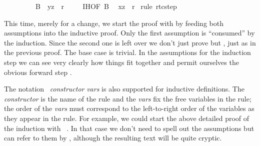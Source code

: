 \begin{isabellebody}
\ \ \ \ \ \ \ \ \ B{}\ \ {}{}y{}z{}\ {}\ r{}{}\isanewline
\ \ \isamarkupfalse%
\ {}\ IH{}OF\ B{}\ \isamarkupfalse%
\ {}{}x{}{}z{}\ {}\ r{}{}\ \isamarkupfalse%
{}rule\ rtc{}step{}\isanewline
{}\isamarkupfalse%
%
\endisatagproof
{\isafoldproof}%
%
\isadelimproof
%
\endisadelimproof
%
\begin{isamarkuptext}%
\noindent
This time, merely for a change, we start the proof with by feeding both
assumptions into the inductive proof. Only the first assumption is
``consumed'' by the induction.
Since the second one is left over we don't just prove  but
, just as in the previous proof.
The base case is trivial. In the assumptions for the induction step we can
see very clearly how things fit together and permit ourselves the
obvious forward step .

The notation ~\isa{(}\emph{constructor} \emph{vars}\isa{)}
is also supported for inductive definitions. The \emph{constructor} is the
name of the rule and the \emph{vars} fix the free variables in the
rule; the order of the \emph{vars} must correspond to the
left-to-right order of the variables as they appear in the rule.
For example, we could start the above detailed proof of the induction
with ~. In that case we don't need
to spell out the assumptions but can refer to them by ,
although the resulting text will be quite cryptic.


\end{isamarkuptext}
\end{isabellebody}
